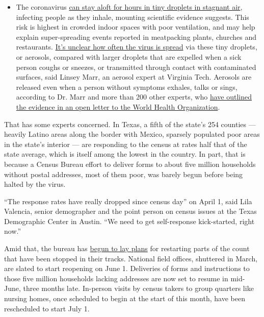 \begin{itemize}
  \begin{itemize}
  \tightlist
  \item
    The coronavirus
    \href{https://www.nytimes.com/2020/07/04/health/239-experts-with-one-big-claim-the-coronavirus-is-airborne.html?action=click\&pgtype=Article\&state=default\&region=MAIN_CONTENT_3\&context=storylines_faq}{can
    stay aloft for hours in tiny droplets in stagnant air}, infecting
    people as they inhale, mounting scientific evidence suggests. This
    risk is highest in crowded indoor spaces with poor ventilation, and
    may help explain super-spreading events reported in meatpacking
    plants, churches and restaurants.
    \href{https://www.nytimes.com/2020/07/06/health/coronavirus-airborne-aerosols.html?action=click\&pgtype=Article\&state=default\&region=MAIN_CONTENT_3\&context=storylines_faq}{It's
    unclear how often the virus is spread} via these tiny droplets, or
    aerosols, compared with larger droplets that are expelled when a
    sick person coughs or sneezes, or transmitted through contact with
    contaminated surfaces, said Linsey Marr, an aerosol expert at
    Virginia Tech. Aerosols are released even when a person without
    symptoms exhales, talks or sings, according to Dr. Marr and more
    than 200 other experts, who
    \href{https://academic.oup.com/cid/article/doi/10.1093/cid/ciaa939/5867798}{have
    outlined the evidence in an open letter to the World Health
    Organization}.
  \end{itemize}
\end{itemize}

That has some experts concerned. In Texas, a fifth of the state's 254
counties --- heavily Latino areas along the border with Mexico, sparsely
populated poor areas in the state's interior --- are responding to the
census at rates half that of the state average, which is itself among
the lowest in the country. In part, that is because a Census Bureau
effort to deliver forms to about five million households without postal
addresses, most of them poor, was barely begun before being halted by
the virus.

``The response rates have really dropped since census day'' on April 1,
said Lila Valencia, senior demographer and the point person on census
issues at the Texas Demographic Center in Austin. ``We need to get
self-response kick-started, right now.''

Amid that, the bureau has
\href{https://2020census.gov/content/dam/2020census/materials/news/2020-census\%20operational-adjustments-long\%20version.pdf}{begun
to lay plans} for restarting parts of the count that have been stopped
in their tracks. National field offices, shuttered in March, are slated
to start reopening on June 1. Deliveries of forms and instructions to
those five million households lacking addresses are now set to resume in
mid-June, three months late. In-person visits by census takers to group
quarters like nursing homes, once scheduled to begin at the start of
this month, have been rescheduled to start July 1.


